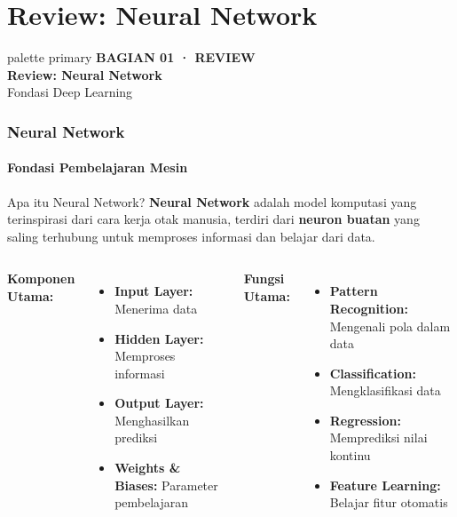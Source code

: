 \documentclass[t,aspectratio=169,xcolor=dvipsnames]{beamer}
\begin{document}
\section{Review: Neural Network}

\begin{frame}[plain]
  \begin{beamercolorbox}[wd=\paperwidth,ht=\paperheight,sep=1.5cm]{palette primary}
    \vspace{1.5cm}
    {\scriptsize\bfseries\color{dlMute}BAGIAN 01 · REVIEW}\\[0.4cm]
    {\Huge\bfseries Review: Neural Network}\\[0.4cm]
    {\small\color{dlHairline}Fondasi Deep Learning}
    \vfill
  \end{beamercolorbox}
\end{frame}

\begin{frame}
    \frametitle{Neural Network}
    \framesubtitle{Fondasi Pembelajaran Mesin}
    \small
    \begin{block}{Apa itu Neural Network?}
        \textbf{Neural Network} adalah model komputasi yang terinspirasi dari cara kerja otak manusia, terdiri dari \textbf{neuron buatan} yang saling terhubung untuk memproses informasi dan belajar dari data.
    \end{block}

    \begin{columns}[t]
        \textbf{Komponen Utama:}
        \begin{itemize}
            \item \textbf{Input Layer:} Menerima data
            \item \textbf{Hidden Layer:} Memproses informasi
            \item \textbf{Output Layer:} Menghasilkan prediksi
            \item \textbf{Weights \& Biases:} Parameter pembelajaran
        \end{itemize}

        \textbf{Fungsi Utama:}
        \begin{itemize}
            \item \textbf{Pattern Recognition:} Mengenali pola dalam data
            \item \textbf{Classification:} Mengklasifikasi data
            \item \textbf{Regression:} Memprediksi nilai kontinu
            \item \textbf{Feature Learning:} Belajar fitur otomatis
        \end{itemize}
    \end{columns}

\end{frame}
\end{document}
